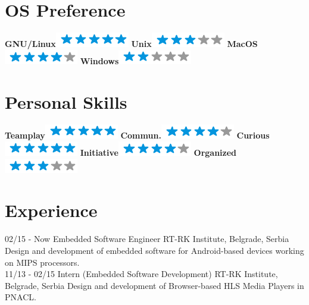 \documentclass[]{rankovic-cv}
\begin{document}
\begin{aside}
  \section{OS Preference}
    \textbf{GNU/Linux}\includegraphics[scale=0.40]{img/5stars.png}
    \textbf{Unix}\includegraphics[scale=0.40]{img/3stars.png}
    \textbf{MacOS}\includegraphics[scale=0.40]{img/4stars.png}
    \textbf{Windows}\includegraphics[scale=0.40]{img/2stars.png}
    ~
  \section{Personal Skills}
    \textbf{Teamplay}\includegraphics[scale=0.40]{img/5stars.png}
    \textbf{Commun.}\includegraphics[scale=0.40]{img/4stars.png}
    \textbf{Curious}\includegraphics[scale=0.40]{img/5stars.png}
    \textbf{Initiative}\includegraphics[scale=0.40]{img/4stars.png}
    \textbf{Organized}\includegraphics[scale=0.40]{img/3stars.png}
    ~
\end{aside}

\section{Experience}
\begin{entrylist}
  \entry
    {02/15 - Now}
    {Embedded Software Engineer}
    {RT-RK Institute, Belgrade, Serbia}
    {Design and development of embedded software     for Android-based devices working on MIPS processors.\\}
  \entry
    {11/13 - 02/15}
    {Intern (Embedded Software Development)}
    {RT-RK Institute, Belgrade, Serbia}
    {Design and development of Browser-based HLS Media Players in PNACL.\\}
\end{entrylist}
\end{document}
